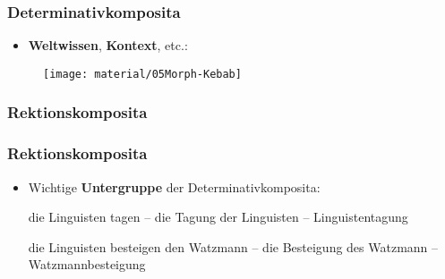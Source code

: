 \begin{frame}
\frametitle{Determinativkomposita}

\begin{itemize}
	\item \textbf{Weltwissen}, \textbf{Kontext}, etc.:
\end{itemize}

\begin{figure}
\centering
\texttt{[image: material/05Morph-Kebab]}
\end{figure}

\end{frame}


\subsubsection{Rektionskomposita}


\begin{frame}
\frametitle{Rektionskomposita}

\begin{itemize}
	\item Wichtige \textbf{Untergruppe} der Determinativkomposita:
	
	\ea \label{ex:Bsp1} die Linguisten tagen – die Tagung der Linguisten – Linguistentagung
	\z
	
	\ea \label{ex:Bsp2} die Linguisten besteigen den Watzmann – die Besteigung des Watzmann – Watzmannbesteigung
	\z
		 
\end{itemize}


\end{frame}


